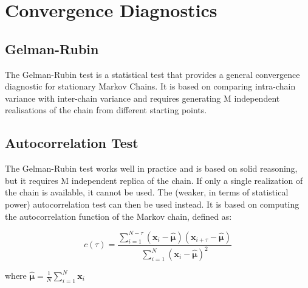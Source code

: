 
\section{Convergence Diagnostics}


\subsection{ Gelman-Rubin }

The Gelman-Rubin test is a statistical test that provides a general convergence diagnostic for stationary Markov Chains. 
It is based on comparing intra-chain variance with inter-chain variance and requires generating M independent realisations of the chain from different starting points.


\subsection{ Autocorrelation Test }
The Gelman-Rubin test works well in practice and is based on solid reasoning, but it requires M independent replica of the chain. 
If only a single realization of the chain is available, it cannot be used. 
The (weaker, in terms of statistical power) autocorrelation test can then be used instead. 
It is based on computing the autocorrelation function of the Markov chain, defined as:

\[
	c(\tau) = \frac
		{ \sum_{i = 1}^{N - \tau} (\bm{x}_i - \hat{\bm{\mu}}) (\bm{x}_{i+\tau} - \hat{\bm{\mu}}) }
		{ \sum_{i = 1}^N (\bm{x}_i - \hat{\bm{\mu}})^2 }
\]

where $ \hat{\bm{\mu}} = \frac{1}{N} \sum_{i = 1}^N \bm{x}_i $



